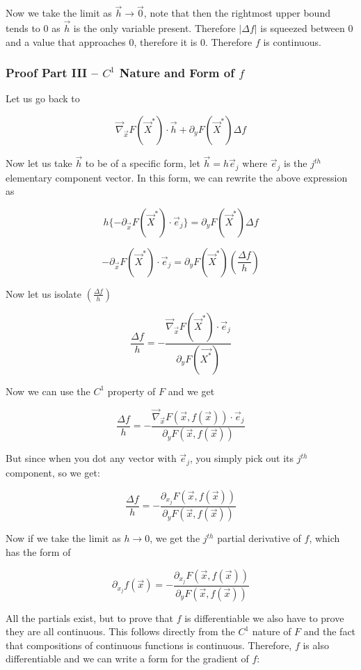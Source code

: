 \documentclass [12 pt, twoside] {book}
\newcommand\+{\text{ }}
\newcommand{\gradient}{\vec{\nabla}}
\begin{document}
Now we take the limit as $\vec{h} \to \vec{0}$, note that then the rightmost upper
bound tends to $0$ as $\vec{h}$ is the only variable present. Therefore $|\Delta
f|$ is squeezed between $0$ and a value that approaches $0$, therefore it is
$0$. Therefore $f$ is continuous.

\subsubsection{Proof Part III -- $C^1$ Nature and Form of $f$}

Let us go back to

$$\gradient_{\vec{x}} F(\vec{X}^*) \cdot \vec{h} + \partial_y F(\vec{X}^*)
\Delta f$$

Now let us take $\vec{h}$ to be of a specific form, let $\vec{h} = h\vec{e}_j$
where $\vec{e}_j$ is the $j^{th}$ elementary component vector. In this form, we
can rewrite the above expression as

$$h\{-\partial_{\vec{x}} F(\vec{X}^*) \cdot \vec{e}_j\} = \partial_y
F(\vec{X}^*) \Delta f$$

$$- \partial_{\vec{x}} F(\vec{X}^*) \cdot \vec{e}_j = \partial_y
F(\vec{X}^*)\left(\frac{\Delta f}{h}\right)$$

Now let us isolate $\left(\frac{\Delta f}{h}\right)$

$$\frac{\Delta f}{h} = - \frac{\gradient_{\vec{x}} F(\vec{X}^*) \cdot
\vec{e}_j}{\partial_y F(\vec{X^*})}$$

Now we can use the $C^1$ property of $F$ and we get

$$\frac{\Delta f}{h} = -\frac{\gradient_{\vec{x}} F(\vec{x},
f(\vec{x}))\cdot \vec{e}_j}{\partial_y F(\vec{x}, f(\vec{x}))}$$

But since when you dot any vector with $\vec{e}_j$, you simply pick out its
$j^{th}$ component, so we get:

$$\frac{\Delta f}{h} = -\frac{\partial_{x_j} F(\vec{x}, f(\vec{x}))}{\partial_y
F(\vec{x}, f(\vec{x}))}$$

Now if we take the limit as $h \to 0$, we get the $j^{th}$ partial derivative of
$f$, which has the form of

$$\partial_{x_j} f(\vec{x}) = - \frac{\partial_{x_j} F(\vec{x}, f(\vec{x}))}{\partial_y
F(\vec{x}, f(\vec{x}))}$$

All the partials exist, but to prove that $f$ is differentiable we also have to
prove they are all continuous. This follows directly from the $C^1$ nature of
$F$ and the fact that compositions of continuous functions is continuous.
Therefore, $f$ is also differentiable and we can write a form for the gradient
of $f$:
\end{document}
